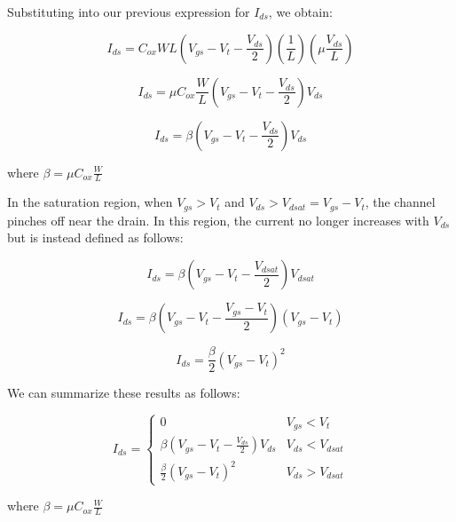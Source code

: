 \documentclass[fleqn]{article}
\begin{document}
\begin{enumerate}
		Substituting into our previous expression for $I_{ds}$, we obtain:
		
		\begin{equation*}
			I_{ds} = C_{ox}WL\left(V_{gs} - V_t - \frac{V_{ds}}{2}\right)\left(\frac{1}{L}\right)\left(\mu\frac{V_{ds}}{L}\right)
		\end{equation*}
		
		\begin{equation*}
			I_{ds} = \mu{C_{ox}}\frac{W}{L}\left(V_{gs} - V_t - \frac{V_{ds}}{2}\right)V_{ds}
		\end{equation*}
		
		\begin{equation*}
			I_{ds} = \beta\left(V_{gs} - V_t - \frac{V_{ds}}{2}\right)V_{ds}
		\end{equation*}
		
		where $\beta = \mu{C_{ox}}\frac{W}{L}$
		
		In the saturation region, when $V_{gs} > V_t$ and $V_{ds} > V_{dsat} = V_{gs} - V_t$, the channel pinches off near the drain. In this region, the current no longer increases with $V_{ds}$ but is instead defined as follows:
		
		\begin{equation*}		
			I_{ds} = \beta\left(V_{gs} - V_t - \frac{V_{dsat}}{2}\right)V_{dsat}
		\end{equation*}
		 
		 \begin{equation*}		
			I_{ds} = \beta\left(V_{gs} - V_t - \frac{V_{gs} - V_t}{2}\right)\left(V_{gs} - V_t\right)
		\end{equation*}
		
		\begin{equation*}		
			I_{ds} = \frac{\beta}{2}\left(V_{gs} - V_t\right)^2
		\end{equation*}
		
		We can summarize these results as follows:
		
		\begin{equation*}
			I_{ds} = \begin{cases}
				0 & V_{gs} < V_t \\
				\beta\left(V_{gs}-V_t-\frac{V_{ds}}{2}\right)V_{ds} & V_{ds} < V_{dsat} \\
				\frac{\beta}{2}(V_{gs}-V_t)^2 & V_{ds} > V_{dsat}
			\end{cases}
		\end{equation*}
		
		where $\beta = \mu{C_{ox}}\frac{W}{L}$
		

\end{enumerate}
\end{document}
